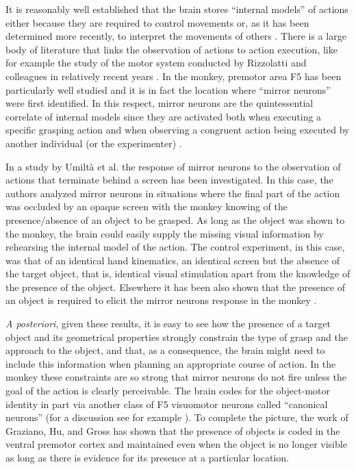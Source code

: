 It is reasonably well established that the brain stores ``internal
models'' of actions either because they are required to control
movements or, as it has been determined more recently, to interpret
the movements of others \cite{kawato-99, wolpert-03, mussaivaldi-00,
lackner-98}. There is a large body of literature that links the
observation of actions to action execution, like for example the study
of the motor system conducted by Rizzolatti and colleagues in
relatively recent years
\cite{rizzolatti-04,gallese-96,rizzolatti-01}. In the monkey, premotor
area F5 has been particularly well studied and it is in fact the
location where ``mirror neurons'' were first identified. In this
respect, mirror neurons are the quintessential correlate of internal
models since they are activated both when executing a specific
grasping action and when observing a congruent action being executed
by another individual (or the experimenter)
\cite{fadiga-00}.

In a study by Umilt\`a et al. \cite{umilta-01} the response of mirror
neurons to the observation of actions that terminate behind a screen
has been investigated. In this case, the authors analyzed mirror
neurons in situations where the final part of the action was occluded
by an opaque screen with the monkey knowing of the presence/absence of
an object to be grasped. As long as the object was shown to the
monkey, the brain could easily supply the missing visual information
by rehearsing the internal model of the action. The control
experiment, in this case, was that of an identical hand kinematics, an
identical screen but the absence of the target object, that is,
identical visual stimulation apart from the knowledge of the presence
of the object. Elsewhere it has been also shown that the presence of
an object is required to elicit the mirror neurons response in the
monkey \cite{gallese-96}.

{\em A posteriori}, given these results, it is easy to see how the
presence of a target object and its geometrical properties strongly
constrain the type of grasp and the approach to the object, and that,
as a consequence, the brain might need to include this information
when planning an appropriate course of action. In the monkey these
constraints are so strong that mirror neurons do not fire unless the
goal of the action is clearly perceivable. The brain codes for the
object-motor identity in part via another class of F5 visuomotor
neurons called ``canonical neurons'' (for a discussion see for example
\cite{metta-06}). To complete the picture, the work of Graziano,
Hu, and Gross \cite{graziano-97} has shown that the presence of
objects is coded in the ventral premotor cortex and maintained even
when the object is no longer visible as long as there is evidence for
its presence at a particular location.

